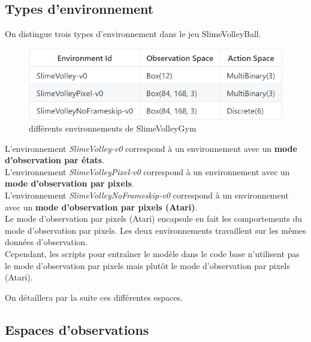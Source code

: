 \documentclass[11pt, a4paper]{article}
\begin{document}
\subsection{\textbf{Types d'environnement}} 

  \noindent On distingue trois types d'environnement dans le jeu SlimeVolleyBall.

	\begin{figure}[H]
		\centering
		\includegraphics{../images/environnementsS.PNG}
		\caption {différents environnements de SlimeVolleyGym}
	\end{figure}

  \noindent L'environnement \textit{SlimeVolley-v0} correspond à un environnement avec un \textbf{mode d'observation par états}. \\
  L'environnement \textit{SlimeVolleyPixel-v0} correspond à un environnement avec un \textbf{mode d'observation par pixels}. \\
  L'environnement \textit{SlimeVolleyNoFrameskip-v0} correspond à un environnement avec un \textbf{mode d'observation par pixels (Atari)}. \\

  \noindent Le mode d'observation par pixels (Atari) encapsule en fait les comportements du mode d'observation par pixels. Les deux environnements travaillent
  sur les mêmes données d'observation. \\
  Cependant, les scripts pour entraîner le modèle dans le code base n'utilisent pas le mode d'observation par pixels mais plutôt le mode d'observation par pixels (Atari).

  \noindent On détaillera par la suite ces différentes espaces. \\

  \subsection{\textbf{Espaces d'observations}} 
\end{document}
